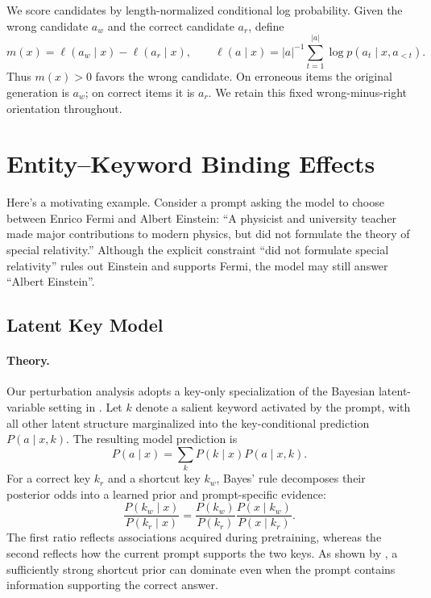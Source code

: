 We score candidates by length-normalized conditional log probability. Given
the wrong candidate $a_w$ and the correct candidate $a_r$, define
\begin{equation}
m(x)=\ell(a_w\mid x)-\ell(a_r\mid x),\qquad
\ell(a\mid x)=|a|^{-1}\sum_{t=1}^{|a|}\log p(a_t\mid x,a_{<t}).
\label{eq:wrong-right-margin}
\end{equation}
Thus $m(x)>0$ favors the wrong candidate.  On erroneous items the original
generation is $a_w$; on correct items it is $a_r$.  We retain this fixed
wrong-minus-right orientation throughout.
\fi

\section{Entity--Keyword Binding Effects}
\label{sec:binding}
Here's a motivating example. Consider a prompt asking the model
to choose between Enrico Fermi and Albert Einstein: “A physicist and university teacher made major contributions to modern physics, but did not formulate the theory of special relativity.” Although
the explicit constraint “did not formulate special
relativity” rules out Einstein and supports Fermi,
the model may still answer “Albert Einstein”.

\subsection{Latent Key Model}
\paragraph{Theory.}
Our perturbation analysis adopts a key-only specialization of the Bayesian
latent-variable setting in \citet{hu2026reasoningpriors}.  Let $k$ denote a
salient keyword activated by the prompt, with all other latent structure
marginalized into the key-conditional prediction $P(a\mid x,k)$.  The resulting
model prediction is
\begin{equation}
P(a\mid x)=\sum_k P(k\mid x)P(a\mid x,k).
\label{eq:latent-key-mixture}
\end{equation}
For a correct key $k_r$ and a shortcut key $k_w$, Bayes' rule decomposes their
posterior odds into a learned prior and prompt-specific evidence:
\begin{equation}
\frac{P(k_w\mid x)}{P(k_r\mid x)}
=
\frac{P(k_w)}{P(k_r)}
\frac{P(x\mid k_w)}{P(x\mid k_r)}.
\label{eq:key-posterior-odds}
\end{equation}
The first ratio reflects associations acquired during pretraining, whereas the
second reflects how the current prompt supports the two keys.  As shown by
\citet{hu2026reasoningpriors}, a sufficiently strong shortcut prior can dominate
even when the prompt contains information supporting the correct answer.

